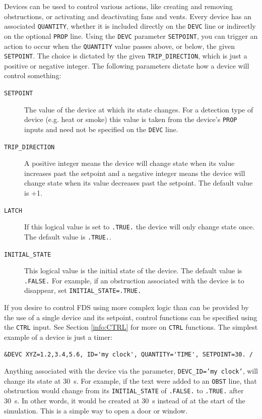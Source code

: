 \documentclass[11pt]{book}
\newcommand{\ct}{\tt\small}
\begin{document}
Devices can be used to control various actions, like creating and removing obstructions, or activating and deactivating
fans and vents. Every device has an associated {\ct QUANTITY}, whether it is included directly on the {\ct DEVC} line or
indirectly on the optional {\ct PROP} line. Using the {\ct DEVC} parameter {\ct SETPOINT}, you can trigger an action to
occur when the {\ct QUANTITY} value passes above, or below, the given {\ct SETPOINT}. The choice is dictated by the
given {\ct TRIP\_DIRECTION}, which is just a positive or negative integer.
The following parameters dictate how a device will control something:
\begin{description}
\item[{\ct SETPOINT}] The value of the device at which its state changes.  For a detection type of device
(e.g. heat or smoke) this value is taken from the device's {\ct PROP} inputs and need not be specified on the {\ct DEVC} line.
\item[{\ct TRIP\_DIRECTION}] A positive integer means the device will change state when its value increases
past the setpoint and a negative integer means the device will change state
when its value decreases past the setpoint.  The default value is +1.
\item[{\ct LATCH}] If this logical value is set to {\ct .TRUE.} the device will only change state once.
The default value is {\ct .TRUE.}.
\item[{\ct INITIAL\_STATE}] This logical value is the initial state of the device. The default value
is {\ct .FALSE.} For example, if an obstruction associated with the device is to disappear, set {\ct INITIAL\_STATE=.TRUE.}
\end{description}
If you desire to control FDS using more complex logic than can be provided
by the use of a single device and its setpoint, control functions can be specified using the {\ct CTRL} input.
See Section \ref{info:CTRL} for more on {\ct CTRL} functions.
The simplest example of a device is just a timer:

\footnotesize
\begin{verbatim}
&DEVC XYZ=1.2,3.4,5.6, ID='my clock', QUANTITY='TIME', SETPOINT=30. /
\end{verbatim}
\normalsize

\noindent
Anything associated with the device via the parameter, {\ct DEVC\_ID='my clock'}, will change its state at 30~s. For example,
if the text were added to an {\ct OBST} line, that obstruction would change from its {\ct INITIAL\_STATE} of {\ct .FALSE.} to {\ct .TRUE.} after
30~s. In other words, it would be created at 30~s instead of at the start of the simulation. This is a simple way to open a door or window.
\end{document}
